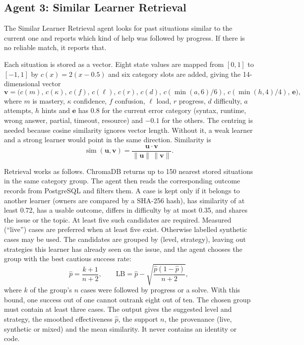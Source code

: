 \subsection{Agent 3: Similar Learner Retrieval}
The Similar Learner Retrieval agent looks for past situations similar to the current one and reports which kind of help was followed by progress. If there is no reliable match, it reports that.

Each situation is stored as a vector. Eight state values are mapped from $[0,1]$ to $[-1,1]$ by $c(x)=2(x-0.5)$ and six category slots are added, giving the 14-dimensional vector
\begin{equation}
\mathbf{v}=\big(c(m),\,c(\kappa),\,c(f),\,c(\ell),\,c(r),\,c(d),\,c(\min(a,6)/6),\,c(\min(h,4)/4),\,\mathbf{e}\big),
\end{equation}
where $m$ is mastery, $\kappa$ confidence, $f$ confusion, $\ell$ load, $r$ progress, $d$ difficulty, $a$ attempts, $h$ hints and $\mathbf{e}$ has 0.8 for the current error category (syntax, runtime, wrong answer, partial, timeout, resource) and $-0.1$ for the others. The centring is needed because cosine similarity ignores vector length. Without it, a weak learner and a strong learner would point in the same direction. Similarity is
\begin{equation}
\operatorname{sim}(\mathbf{u},\mathbf{v})=\frac{\mathbf{u}\cdot\mathbf{v}}{\lVert\mathbf{u}\rVert\,\lVert\mathbf{v}\rVert}.
\end{equation}

Retrieval works as follows. ChromaDB returns up to 150 nearest stored situations in the same category group. The agent then reads the corresponding outcome records from PostgreSQL and filters them. A case is kept only if it belongs to another learner (owners are compared by a SHA-256 hash), has similarity of at least 0.72, has a usable outcome, differs in difficulty by at most 0.35, and shares the issue or the topic. At least five such candidates are required. Measured (``live'') cases are preferred when at least five exist. Otherwise labelled synthetic cases may be used. The candidates are grouped by (level, strategy), leaving out strategies this learner has already seen on the issue, and the agent chooses the group with the best cautious success rate:
\begin{equation}
\hat p=\frac{k+1}{n+2},\qquad \text{LB}=\hat p-\sqrt{\frac{\hat p(1-\hat p)}{n+2}},
\end{equation}
where $k$ of the group's $n$ cases were followed by progress or a solve. With this bound, one success out of one cannot outrank eight out of ten. The chosen group must contain at least three cases. The output gives the suggested level and strategy, the smoothed effectiveness $\hat p$, the support $n$, the provenance (live, synthetic or mixed) and the mean similarity. It never contains an identity or code.

